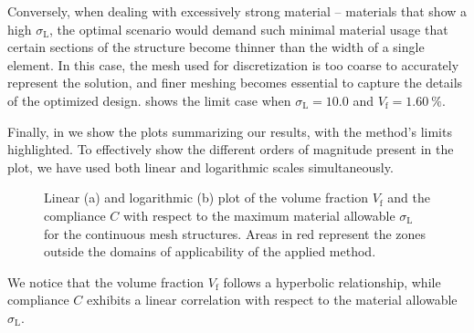 Conversely, when dealing with excessively strong material -- \ie materials that show a high $\sigma_\text{L}$, the optimal scenario would demand such minimal material usage that certain sections of the structure become thinner than the width of a single element. In this case, the mesh used for discretization is too coarse to accurately represent the solution, and finer meshing becomes essential to capture the details of the optimized design.  shows
the limit case when $\sigma_\text{L}=10.0$ and $V_\text{f}=\qty{1.60}{\percent}$.

Finally, in  we show the plots summarizing our results, with the method's limits highlighted. To effectively show the different orders of magnitude present in the plot, we have used both linear and logarithmic scales simultaneously.
\begin{figure}
    \hspace*{\fill}
    \hfill
    \hspace*{\fill}
    \caption{Linear (a) and logarithmic (b) plot of the volume fraction $V_\text{f}$ and the compliance $C$ with respect to the maximum material allowable $\sigma_\text{L}$ for the continuous mesh structures. Areas in red represent the zones outside the domains of applicability of the applied method.}
    \label{fig:03_to_plot}
\end{figure}
We notice that the volume fraction $V_\text{f}$ follows a hyperbolic relationship, while compliance $C$ exhibits a linear correlation with respect to the material allowable $\sigma_\text{L}$.

